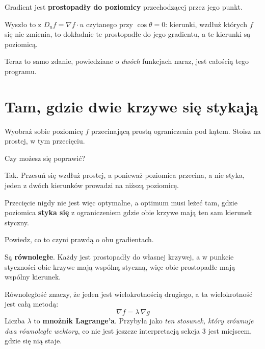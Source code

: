 \begin{fr}
\begin{ansblock}
Gradient jest \textbf{prostopadły do poziomicy} przechodzącej przez jego punkt.
\end{ansblock}

Wyszło to z $D_u f = \nabla f \cdot u$ czytanego przy $\cos\theta = 0$:
kierunki, wzdłuż których $f$ się nie zmienia, to dokładnie te prostopadłe do
jego gradientu, a te kierunki są poziomicą.

Teraz to samo zdanie, powiedziane o \emph{dwóch} funkcjach naraz, jest całością
tego programu.

\end{fr}

\section{Tam, gdzie dwie krzywe się stykają}
\label{sec:P22-stationarity}

\begin{fr}
Wyobraź sobie poziomicę $f$ przecinającą prostą ograniczenia pod kątem. Stoisz
na prostej, w tym przecięciu.

Czy możesz się poprawić?
\dotline
\nextframe
\end{fr}

\begin{fr}
\begin{ansblock}
Tak. Przesuń się wzdłuż prostej, a ponieważ poziomica przecina, a nie styka,
jeden z dwóch kierunków prowadzi na niższą poziomicę.
\end{ansblock}

Przecięcie nigdy nie jest więc optymalne, a optimum musi leżeć tam, gdzie
poziomica \textbf{styka się} z ograniczeniem \dash{} gdzie obie krzywe mają ten
sam kierunek styczny.

Powiedz, co to czyni prawdą o obu gradientach.
\nextframe
\end{fr}

\begin{fr}
\begin{ansblock}
Są \textbf{równoległe}. Każdy jest prostopadły do własnej krzywej, a w punkcie
styczności obie krzywe mają wspólną styczną, więc obie prostopadłe mają wspólny
kierunek.
\end{ansblock}

Równoległość znaczy, że jeden jest wielokrotnością drugiego, a ta wielokrotność
jest całą metodą:
\[ \nabla f = \lambda \,\nabla g \]
Liczba $\lambda$ to \textbf{mnożnik Lagrange'a}. Przybyła jako \emph{ten
stosunek, który zrównuje dwa równoległe wektory}, co nie jest jeszcze
interpretacją \dash{} sekcja 3 jest miejscem, gdzie się nią staje.
\end{fr}

